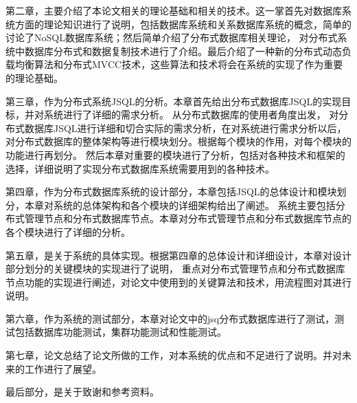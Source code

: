 第二章，主要介绍了本论文相关的理论基础和相关的技术。这一掌首先对数据库系统方面的理论知识进行了说明，包括数据库系统和关系数据库系统的概念，简单的讨论了NoSQL数据库系统；然后简单介绍了分布式数据库相关理论，
对分布式系统中数据库分布式和数据复制技术进行了介绍。最后介绍了一种新的分布式动态负载均衡算法和分布式MVCC技术，这些算法和技术将会在系统的实现了作为重要的理论基础。

第三章，作为分布式系统JSQL的分析。本章首先给出分布式数据库JSQL的实现目标，并对系统进行了详细的需求分析。
从分布式数据库的使用者角度出发，
对分布式数据库JSQL进行详细和切合实际的需求分析，在对系统进行需求分析以后，
对分布式数据库的整体架构等进行模块划分。根据每个模块的作用，对每个模块的功能进行再划分。
然后本章对重要的模块进行了分析，包括对各种技术和框架的选择，详细说明了实现分布式数据库系统需要用到的各种技术。

第四章，作为分布式数据库系统的设计部分，本章包括JSQL的总体设计和模块划分，本章对系统的总体架构和各个模块的详细架构给出了阐述。
系统主要包括分布式管理节点和分布式数据库节点。本章对分布式管理节点和分布式数据库节点的各个模块进行了详细的分析。

第五章，是关于系统的具体实现。根据第四章的总体设计和详细设计，本章对设计部分划分的关键模块的实现进行了说明，
重点对分布式管理节点和分布式数据库节点功能的实现进行阐述，对论文中使用到的关键算法和技术，用流程图对其进行说明。

第六章，作为系统的测试部分，本章对论文中的jsq分布式数据库进行了测试，测试包括数据库功能测试，集群功能测试和性能测试。

第七章，论文总结了论文所做的工作，对本系统的优点和不足进行了说明。并对未来的工作进行了展望。

最后部分，是关于致谢和参考资料。